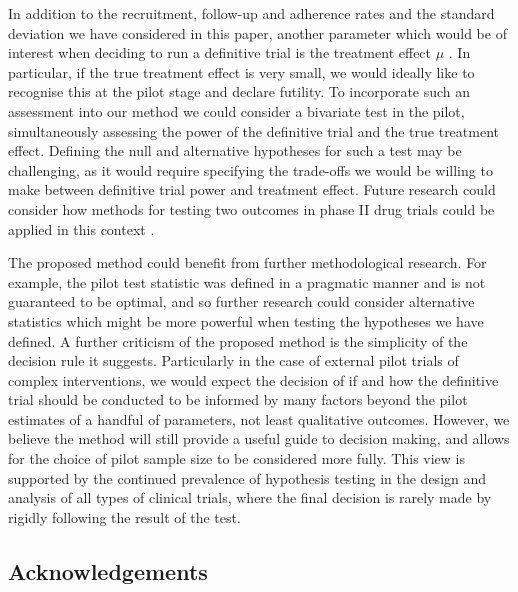 \documentclass[AMA,STIX1COL]{WileyNJD-v2}
\begin{document}

In addition to the recruitment, follow-up and adherence rates and the standard deviation we have considered in this paper, another parameter which would be of interest when deciding to run a definitive trial is the treatment effect $\mu$ \cite{Wilson2015}. In particular, if the true treatment effect is very small, we would ideally like to recognise this at the pilot stage and declare futility. To incorporate such an assessment into our method we could consider a bivariate test in the pilot, simultaneously assessing the power of the definitive trial and the true treatment effect. Defining the null and alternative hypotheses for such a test may be challenging, as it would require specifying the trade-offs we would be willing to make between definitive trial power and treatment effect. Future research could consider how methods for testing two outcomes in phase II drug trials could be applied in this context \cite{Conaway1996, Thall2008}.


The proposed method could benefit from further methodological research. For example, the pilot test statistic was defined in a pragmatic manner and is not guaranteed to be optimal, and so further research could consider alternative statistics which might be more powerful when testing the hypotheses we have defined. A further criticism of the proposed method is the simplicity of the decision rule it suggests. Particularly in the case of external pilot trials of complex interventions, we would expect the decision of if and how the definitive trial should be conducted to be informed by many factors beyond the pilot estimates of a handful of parameters, not least qualitative outcomes. However, we believe the method will still provide a useful guide to decision making, and allows for the choice of pilot sample size to be considered more fully. This view is supported by the continued prevalence of hypothesis testing in the design and analysis of all types of clinical trials, where the final decision is rarely made by rigidly following the result of the test. 

\subsection*{Acknowledgements}
\end{document}
